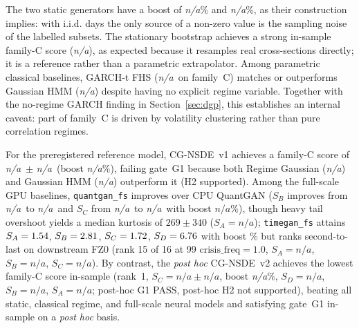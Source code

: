 \documentclass[journal]{IEEEtran}
\newcommand{\pendingnum}{\textit{n/a}}
\providecommand{\boostIidGaussian}{\pendingnum}
\providecommand{\boostTPpca}{\pendingnum}
\providecommand{\boostCgnsde}{\pendingnum}
\providecommand{\boostCgnsdeTwo}{\pendingnum}
\providecommand{\boostQuantganFs}{\pendingnum}
\providecommand{\scoreACgnsdeTwo}{\pendingnum}
\providecommand{\scoreAQuantganFs}{\pendingnum}
\providecommand{\scoreADiffusionFs}{\pendingnum}
\providecommand{\scoreBCgnsdeTwo}{\pendingnum}
\providecommand{\scoreBQuantganFs}{\pendingnum}
\providecommand{\scoreBDiffusionFs}{\pendingnum}
\providecommand{\scoreDCgnsdeTwo}{\pendingnum}
\providecommand{\scoreCCgnsdeOneFull}{\pendingnum}
\providecommand{\scoreCCgnsdeOneFullSd}{\pendingnum}
\providecommand{\scoreCCgnsdeTwoFull}{\pendingnum}
\providecommand{\scoreCCgnsdeTwoFullSd}{\pendingnum}
\providecommand{\scoreCQuantgan}{\pendingnum}
\providecommand{\scoreBQuantgan}{\pendingnum}
\providecommand{\scoreCQuantganFs}{\pendingnum}
\providecommand{\scoreCDiffusionFs}{\pendingnum}
\providecommand{\scoreCRegimeGaussian}{\pendingnum}
\providecommand{\scoreCHmmGaussian}{\pendingnum}
\providecommand{\scoreCStationaryBootstrap}{\pendingnum}
\providecommand{\scoreCGarchFhs}{\pendingnum}
\begin{document}
The two static generators have a boost of \boostIidGaussian\% and \boostTPpca\%, as their construction implies:
with i.i.d. days the only source of a non-zero value is the sampling noise of the labelled subsets. The
stationary bootstrap achieves a strong in-sample family-C score (\scoreCStationaryBootstrap), as expected
because it resamples real cross-sections directly; it is a reference rather than a parametric extrapolator.
Among parametric classical baselines, GARCH-t FHS (\scoreCGarchFhs\ on family~C) matches or outperforms
Gaussian HMM (\scoreCHmmGaussian) despite having no explicit regime variable. Together with the
no-regime GARCH finding in Section~\ref{sec:dgp}, this establishes an internal caveat: part of
family~C is driven by volatility clustering rather than pure correlation regimes.

For the preregistered reference model, CG-NSDE~v1 achieves a family-C score of \scoreCCgnsdeOneFull\ $\pm$
\scoreCCgnsdeOneFullSd\ (boost \boostCgnsde\%), failing gate~G1 because both Regime Gaussian
(\scoreCRegimeGaussian) and Gaussian HMM (\scoreCHmmGaussian) outperform it (H2 supported). Among the
full-scale GPU baselines, \texttt{quantgan\_fs} improves over CPU QuantGAN ($S_B$ improves from
\scoreBQuantgan\ to \scoreBQuantganFs\ and $S_C$ from \scoreCQuantgan\ to \scoreCQuantganFs\ with boost
$\boostQuantganFs\%$), though heavy tail overshoot yields a median kurtosis of $269 \pm 340$ ($S_A =
\scoreAQuantganFs$); \texttt{timegan\_fs} attains $S_A=1.54$, $S_B=2.81$, $S_C=1.72$, $S_D=6.76$ with boost \boostTimeganFs\% but ranks second-to-last on downstream FZ0 (rank 15 of 16 at 99%
$\mathrm{crisis\_freq}=1.0$, $S_A=\scoreADiffusionFs$, $S_B=\scoreBDiffusionFs$, $S_C=\scoreCDiffusionFs$).
By contrast, the \emph{post hoc} CG-NSDE~v2 achieves the lowest family-C score in-sample (rank~1, $S_C =
\scoreCCgnsdeTwoFull \pm \scoreCCgnsdeTwoFullSd$, boost \boostCgnsdeTwo\%, $S_D = \scoreDCgnsdeTwo$, $S_B =
\scoreBCgnsdeTwo$, $S_A = \scoreACgnsdeTwo$; post-hoc G1 PASS, post-hoc H2 not supported), beating all static,
classical regime, and full-scale neural models and satisfying gate~G1 in-sample on a \emph{post hoc} basis.
\end{document}
